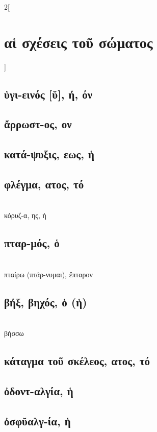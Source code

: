 \documentclass{book}
\begin{document}
\begin{multicols}{2}[\section{αἱ σχέσεις τοῦ σώματος}]
\subsection{ὑγι-εινός [ῠ], ή, όν}
\subsection{ἄρρωστ-ος, ον}           
\subsection{κατά-ψυξις, εως, ἡ}     
\subsection{φλέγμα, ατος, τό}               ~\\
κόρυζ-α, ης, ἡ
\subsection{πταρ-μός, ὁ} ~\\
πταίρω (πτάρ-νυμαι), ἔπταρον 
\subsection{βήξ, βηχός, ὁ (ἡ)}  ~\\
βήσσω
\subsection{κάταγμα τοῦ σκέλεος, ατος, τό}
\subsection{ὀδοντ-αλγία, ἡ}
\subsection{ὀσφῠαλγ-ία, ἡ}

\end{multicols}
\end{document}
